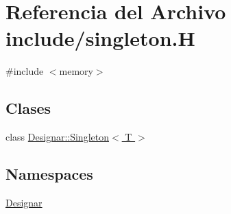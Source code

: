 \hypertarget{singleton_8_h}{}\section{Referencia del Archivo include/singleton.H}
\label{singleton_8_h}
{\ttfamily \#include $<$memory$>$}\newline
\subsection*{Clases}
\begin{DoxyCompactItemize}
\item 
class \hyperlink{class_designar_1_1_singleton}{Designar\+::\+Singleton$<$ T $>$}
\end{DoxyCompactItemize}
\subsection*{Namespaces}
\begin{DoxyCompactItemize}
\item 
 \hyperlink{namespace_designar}{Designar}
\end{DoxyCompactItemize}
